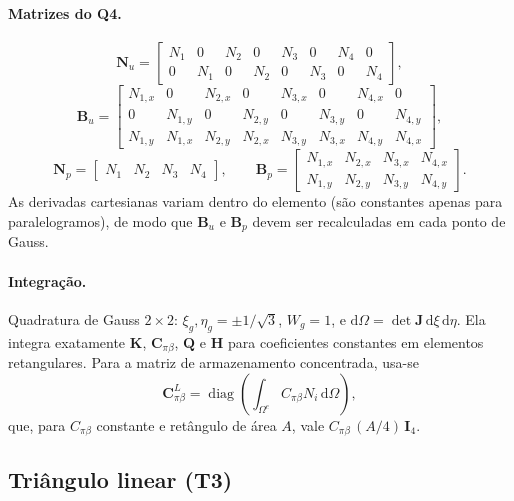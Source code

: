 \documentclass[11pt,a4paper]{article}
\newcommand{\dd}{\mathrm{d}}
\begin{document}
\paragraph{Matrizes do Q4.}
\begin{equation*}
\boxed{\mathbf N_u=\begin{bmatrix}
N_1&0&N_2&0&N_3&0&N_4&0\\
0&N_1&0&N_2&0&N_3&0&N_4
\end{bmatrix},}
\end{equation*}
\begin{equation*}
\boxed{\mathbf B_u=\begin{bmatrix}
N_{1,x}&0&N_{2,x}&0&N_{3,x}&0&N_{4,x}&0\\
0&N_{1,y}&0&N_{2,y}&0&N_{3,y}&0&N_{4,y}\\
N_{1,y}&N_{1,x}&N_{2,y}&N_{2,x}&N_{3,y}&N_{3,x}&N_{4,y}&N_{4,x}
\end{bmatrix},}
\end{equation*}
\begin{equation*}
\boxed{\mathbf N_p=\begin{bmatrix}N_1&N_2&N_3&N_4\end{bmatrix},\qquad
\mathbf B_p=\begin{bmatrix}
N_{1,x}&N_{2,x}&N_{3,x}&N_{4,x}\\
N_{1,y}&N_{2,y}&N_{3,y}&N_{4,y}
\end{bmatrix}.}
\end{equation*}
As derivadas cartesianas variam dentro do elemento (são constantes apenas
para paralelogramos), de modo que $\mathbf B_u$ e $\mathbf B_p$ devem ser
recalculadas em cada ponto de Gauss.

\paragraph{Integração.} Quadratura de Gauss $2\times2$:
$\xi_g,\eta_g=\pm1/\sqrt3$, $W_g=1$, e $\dd\Omega=\det\mathbf J\,\dd\xi\,\dd\eta$.
Ela integra exatamente $\mathbf K$, $\mathbf C_{\pi\beta}$, $\mathbf Q$ e
$\mathbf H$ para coeficientes constantes em elementos retangulares.
Para a matriz de armazenamento concentrada, usa-se
\begin{equation*}
\mathbf C_{\pi\beta}^{L}=\operatorname{diag}\left(\int_{\Omega^e}C_{\pi\beta}N_i\,\dd\Omega\right),
\end{equation*}
que, para $C_{\pi\beta}$ constante e retângulo de área $A$, vale
$C_{\pi\beta}\,(A/4)\,\mathbf I_4$.

\subsection{Triângulo linear (T3)}
\end{document}
